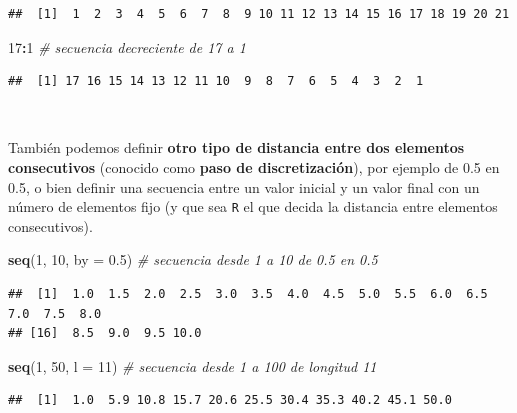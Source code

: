 \documentclass[11pt,]{book}
\newenvironment{Shaded}{\begin{snugshade}}{\end{snugshade}}
\newcommand{\CommentTok}[1]{\textcolor[rgb]{0.37,0.37,0.37}{\textit{#1}}}
\newcommand{\DataTypeTok}[1]{\textcolor[rgb]{0.27,0.27,0.27}{#1}}
\newcommand{\DecValTok}[1]{\textcolor[rgb]{0.06,0.06,0.06}{#1}}
\newcommand{\FloatTok}[1]{\textcolor[rgb]{0.06,0.06,0.06}{#1}}
\newcommand{\KeywordTok}[1]{\textcolor[rgb]{0.27,0.27,0.27}{\textbf{#1}}}
\newcommand{\NormalTok}[1]{#1}
\newcommand{\OperatorTok}[1]{\textcolor[rgb]{0.43,0.43,0.43}{\textbf{#1}}}
\begin{document}
\begin{verbatim}
##  [1]  1  2  3  4  5  6  7  8  9 10 11 12 13 14 15 16 17 18 19 20 21
\end{verbatim}

\begin{Shaded}
\begin{Highlighting}[]
\DecValTok{17}\OperatorTok{:}\DecValTok{1} \CommentTok{# secuencia decreciente de 17 a 1}
\end{Highlighting}
\end{Shaded}

\begin{verbatim}
##  [1] 17 16 15 14 13 12 11 10  9  8  7  6  5  4  3  2  1
\end{verbatim}

~

También podemos definir \textbf{otro tipo de distancia entre dos elementos consecutivos} (conocido como \textbf{paso de discretización}), por ejemplo de 0.5 en 0.5, o bien definir una secuencia entre un valor inicial y un valor final con un número de elementos fijo (y que sea \texttt{R} el que decida la distancia entre elementos consecutivos).

\begin{Shaded}
\begin{Highlighting}[]
\KeywordTok{seq}\NormalTok{(}\DecValTok{1}\NormalTok{, }\DecValTok{10}\NormalTok{, }\DataTypeTok{by =} \FloatTok{0.5}\NormalTok{) }\CommentTok{# secuencia desde 1 a 10 de 0.5 en 0.5}
\end{Highlighting}
\end{Shaded}

\begin{verbatim}
##  [1]  1.0  1.5  2.0  2.5  3.0  3.5  4.0  4.5  5.0  5.5  6.0  6.5  7.0  7.5  8.0
## [16]  8.5  9.0  9.5 10.0
\end{verbatim}

\begin{Shaded}
\begin{Highlighting}[]
\KeywordTok{seq}\NormalTok{(}\DecValTok{1}\NormalTok{, }\DecValTok{50}\NormalTok{, }\DataTypeTok{l =} \DecValTok{11}\NormalTok{) }\CommentTok{# secuencia desde 1 a 100 de longitud 11}
\end{Highlighting}
\end{Shaded}

\begin{verbatim}
##  [1]  1.0  5.9 10.8 15.7 20.6 25.5 30.4 35.3 40.2 45.1 50.0
\end{verbatim}
\end{document}
